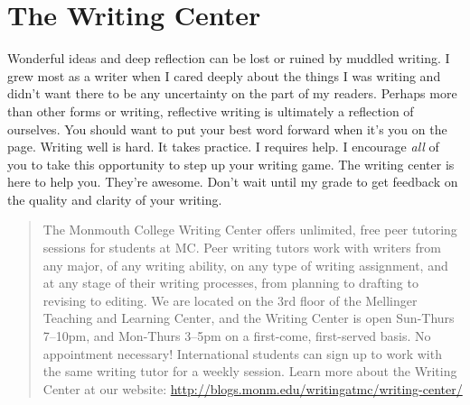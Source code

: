 \documentclass[]{tufte-handout}
\begin{document}
\section{The Writing Center}

Wonderful ideas and deep reflection can be lost or ruined by muddled writing.  I grew most as a writer when I cared deeply about the things I was writing and didn't want there to be any uncertainty on the part of my readers. Perhaps more than other forms or writing, reflective writing is ultimately a reflection of ourselves. You should want to put your best word forward when it's you on the page. Writing well is hard. It takes practice. I requires help. I encourage \textit{all} of you to take this opportunity to step up your writing game. The writing center is here to help you. They're awesome. Don't wait until my grade to get feedback on the quality and clarity of your writing.
\begin{quote}
The Monmouth College Writing Center offers unlimited, free peer tutoring sessions for students at MC\@.  Peer writing tutors work with writers from any major, of any writing ability, on any type of writing assignment, and at any stage of their writing processes, from planning to drafting to revising to editing.  We are located on the 3rd floor of the Mellinger Teaching and Learning Center, and the Writing Center is open Sun-Thurs 7--10pm, and Mon-Thurs 3--5pm on a first-come, first-served basis.  No appointment necessary!  International students can sign up to work with the same writing tutor for a weekly session. Learn more about the Writing Center at our website: \url{http://blogs.monm.edu/writingatmc/writing-center/}
\end{quote}



\end{document}
